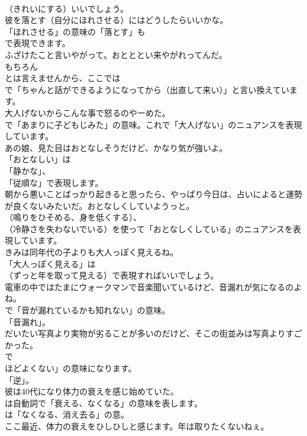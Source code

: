 \documentclass[8pt]{extreport}
\begin{document}
\begin{CJK}{UTF8}{min}
\\	（きれいにする）いいでしょう。	
\\	彼を落とす（自分にほれさせる）にはどうしたらいいかな。 
\\	「ほれさせる」の意味の「落とす」も 
\\	で表現できます。	
\\	ふざけたこと言いやがって。おとととい来やがれってんだ。 
\\	もちろん
\\	とは言えませんから、ここでは 
\\	で「ちゃんと話ができるようになってから（出直して来い）」と言い換えています。	
\\	大人げないからこんな事で怒るのやーめた。 
\\	で「あまりに子どもじみた」の意味。これで「大人げない」のニュアンスを表現しています。	
\\	あの娘、見た目はおとなしそうだけど、かなり気が強いよ。 
\\	「おとなしい」は
\\	「静かな」、
\\	「従順な」で表現します。	
\\	朝から悪いことばっかり起きると思ったら、やっぱり今日は、占いによると運勢が良くないみたいだ。おとなしくしていようっと。 
\\	（鳴りをひそめる、身を低くする）、
\\	（冷静さを失わないでいる）を使って「おとなしくしている」のニュアンスを表現しています。	
\\	きみは同年代の子よりも大人っぽく見えるね。 
\\	「大人っぽく見える」は 
\\	（ずっと年を取って見える）で表現すればいいでしょう。	
\\	電車の中ではたまにウォークマンで音楽聞いているけど、音漏れが気になるのよね。 
\\	で「音が漏れているかも知れない」の意味。
\\	「音漏れ」。	
\\	だいたい写真より実物が劣ることが多いのだけど、そこの街並みは写真よりすごかった。 
\\	で
\\	ほどよくない」の意味になります。
\\	「逆」。	
\\	彼は40代になり体力の衰えを感じ始めていた。 
\\	は自動詞で「衰える、なくなる」の意味を表します。
\\	は「なくなる、消え去る」の意。	
\\	ここ最近、体力の衰えをひしひしと感じます。年は取りたくないねぇ。 

\end{CJK}
\end{document}
